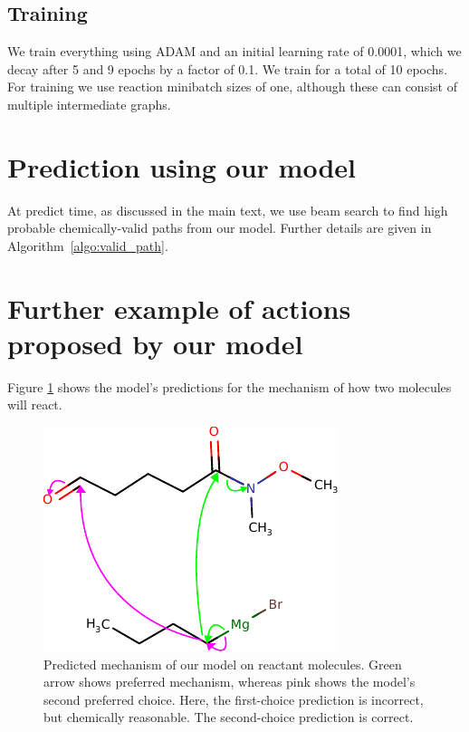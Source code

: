 \subsection{Training}

We train everything using ADAM \citep{kingma2014adam} and an initial learning rate of 0.0001, which we decay after 5 and 9 epochs by a factor of 0.1. 
We train for a total of 10 epochs.
For training we use reaction minibatch sizes of one, although these can consist of multiple intermediate graphs.









\section{Prediction using our model}

At predict time, as discussed in the main text, we use beam search to find high probable chemically-valid paths from our model. Further details are given in Algorithm~\ref{algo:valid_path}.



\section{Further example of actions proposed by our model}

Figure \ref{fig:extra-textbook-example} shows the model's predictions for the mechanism of how two molecules will react. 

\begin{figure}[h]
        \centering
        \includegraphics{imgs/textbook/reactants2}
        \caption{Predicted mechanism of our model on reactant molecules. Green arrow shows preferred mechanism, whereas pink shows the model's second preferred choice. Here, the first-choice prediction is incorrect, but chemically reasonable. The second-choice prediction is correct.}
        \label{fig:extra-textbook-example}
\end{figure}


